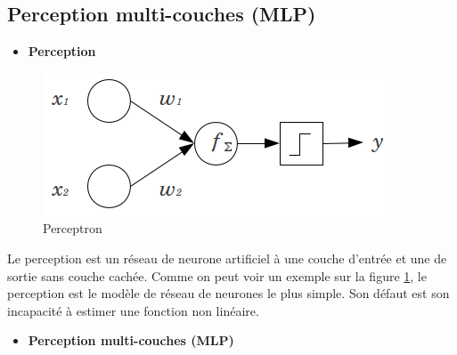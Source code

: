 \subsection{Perception multi-couches (MLP)}
\begin{itemize}
    \item \textbf{Perception} 
\end{itemize}

\begin{figure}[h!]
    \centering
    \includegraphics[scale = 0.6]{images/perceptron.png}
    \caption{Perceptron}
    \label{perceptron}
\end{figure}


Le perception est un réseau de neurone artificiel à une couche d'entrée et une de sortie sans couche cachée. Comme on peut voir un exemple sur la figure \ref{perceptron}, le perception est le modèle de réseau de neurones le plus simple. Son défaut est son incapacité à estimer une fonction non linéaire.\\


\begin{itemize}
    \item \textbf{Perception multi-couches (MLP)}
\end{itemize}



